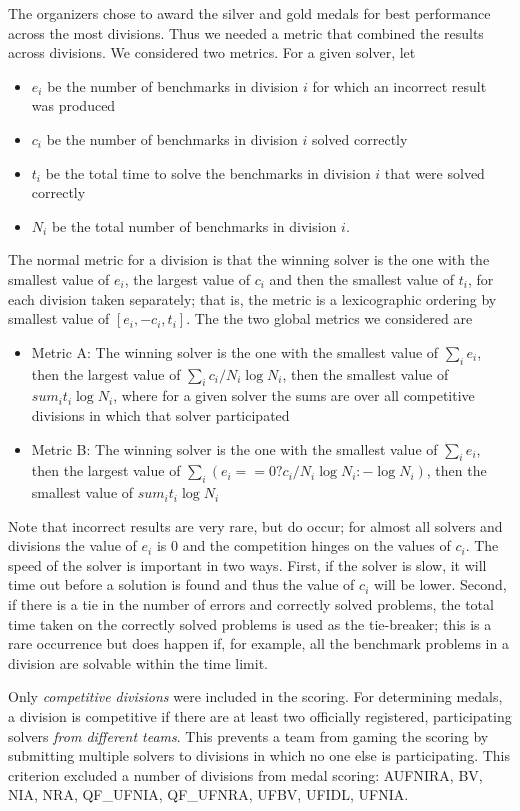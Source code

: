 \documentclass[twosize,11pt]{article}
\begin{document}
The organizers chose to award the silver and gold medals for best performance across the most divisions. Thus we needed a metric that combined the results across divisions. We considered two metrics. For a given solver, let 
\begin{itemize}
\item $e_i$ be the number of benchmarks in division $i$ for which an incorrect result was produced
\item $c_i$ be the number of benchmarks in division $i$ solved correctly
\item $t_i$ be the total time to solve the benchmarks in division $i$ that were solved correctly
\item $N_i$ be the total number of benchmarks in division $i$.
\end{itemize}
The normal metric for a division is that the winning solver is the one with the
smallest value of $e_i$, the largest value of $c_i$ and then the smallest value of $t_i$, for each division taken separately; that is, the metric is a lexicographic ordering by smallest value of $[ e_i, -c_i, t_i ]$.
The the two global metrics we considered are
\begin{itemize}
\item Metric A: The winning solver is the one with the smallest value of $\sum_i e_i$, then the largest value of $\sum_i c_i/N_i \log N_i$, then the smallest value of $sum_i t_i \log N_i$, where for a given solver the sums are over all competitive divisions in which that solver participated
\item Metric B: The winning solver is the one with the smallest value of $\sum_i e_i$, then the largest value of $\sum_i (e_i == 0 ? c_i/N_i \log N_i : - \log N_i )$, then the smallest value of $sum_i t_i \log N_i$ 
\end{itemize}
Note that incorrect results are very rare, but do occur; for almost all solvers and divisions the value of $e_i$ is 0 and the competition hinges on the values of $c_i$. The speed of the solver is important in two ways. First, if the solver is slow, it will time out before a solution is found and thus the value of $c_i$ will be lower. Second, if there is a tie in the number of errors and correctly solved problems, the total time taken on the correctly solved problems is used as the tie-breaker; this is a rare occurrence but does happen if, for example, all the benchmark problems in a division are solvable within the time limit.

Only \textit{competitive divisions} were included in the scoring. For determining medals, a division is competitive if there are at least two officially registered, participating solvers \textit{from different teams}. This prevents a team from gaming the scoring by submitting multiple solvers to divisions in which no one else is participating. This criterion excluded a number of divisions from medal scoring: AUFNIRA, BV, NIA, NRA, QF\_UFNIA, QF\_UFNRA, UFBV, UFIDL, UFNIA.
\end{document}

